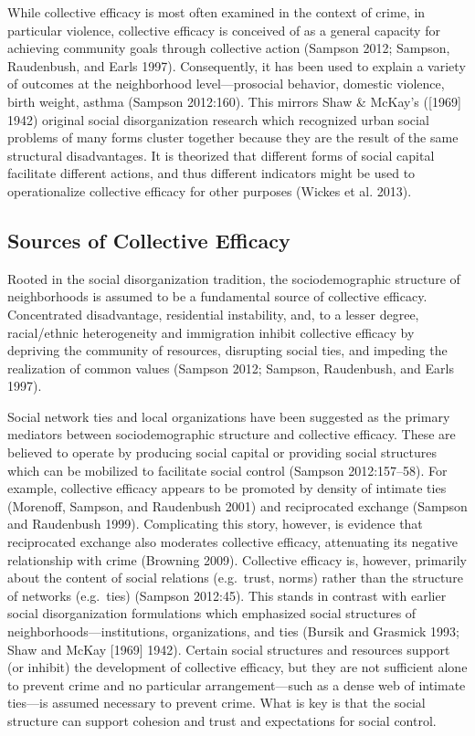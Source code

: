 \documentclass [11pt, proquest] {uwthesis}[2015/03/03]
\begin{document}
While collective efficacy is most often examined in the context of crime, in particular violence, collective efficacy is conceived of as a general capacity for achieving community goals through collective action (Sampson 2012; Sampson, Raudenbush, and Earls 1997). Consequently, it has been used to explain a variety of outcomes at the neighborhood level---prosocial behavior, domestic violence, birth weight, asthma (Sampson 2012:160). This mirrors Shaw \& McKay's ({[}1969{]} 1942) original social disorganization research which recognized urban social problems of many forms cluster together because they are the result of the same structural disadvantages. It is theorized that different forms of social capital facilitate different actions, and thus different indicators might be used to operationalize collective efficacy for other purposes (Wickes et al. 2013).

\hypertarget{sources-of-collective-efficacy}{%
\subsection{Sources of Collective Efficacy}\label{sources-of-collective-efficacy}}

Rooted in the social disorganization tradition, the sociodemographic structure of neighborhoods is assumed to be a fundamental source of collective efficacy. Concentrated disadvantage, residential instability, and, to a lesser degree, racial/ethnic heterogeneity and immigration inhibit collective efficacy by depriving the community of resources, disrupting social ties, and impeding the realization of common values (Sampson 2012; Sampson, Raudenbush, and Earls 1997).

Social network ties and local organizations have been suggested as the primary mediators between sociodemographic structure and collective efficacy. These are believed to operate by producing social capital or providing social structures which can be mobilized to facilitate social control (Sampson 2012:157--58). For example, collective efficacy appears to be promoted by density of intimate ties (Morenoff, Sampson, and Raudenbush 2001) and reciprocated exchange (Sampson and Raudenbush 1999). Complicating this story, however, is evidence that reciprocated exchange also moderates collective efficacy, attenuating its negative relationship with crime (Browning 2009). Collective efficacy is, however, primarily about the content of social relations (e.g.~trust, norms) rather than the structure of networks (e.g.~ties) (Sampson 2012:45). This stands in contrast with earlier social disorganization formulations which emphasized social structures of neighborhoods---institutions, organizations, and ties (Bursik and Grasmick 1993; Shaw and McKay {[}1969{]} 1942). Certain social structures and resources support (or inhibit) the development of collective efficacy, but they are not sufficient alone to prevent crime and no particular arrangement---such as a dense web of intimate ties---is assumed necessary to prevent crime. What is key is that the social structure can support cohesion and trust and expectations for social control.
\end{document}
